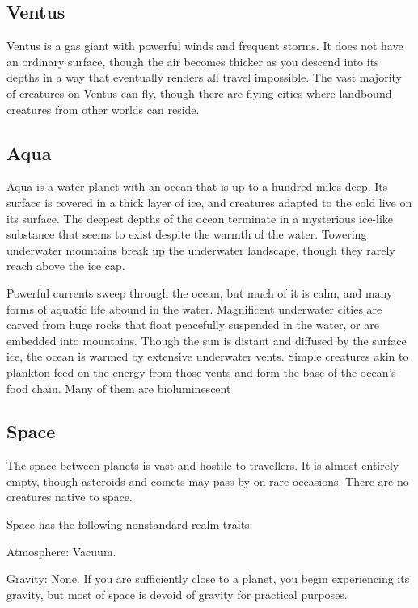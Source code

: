  \subsection{Ventus}
    Ventus is a gas giant with powerful winds and frequent storms.
    It does not have an ordinary surface, though the air becomes thicker as you descend into its depths in a way that eventually renders all travel impossible.
    The vast majority of creatures on Ventus can fly, though there are flying cities where landbound creatures from other worlds can reside.

  \subsection{Aqua}
    Aqua is a water planet with an ocean that is up to a hundred miles deep.
    Its surface is covered in a thick layer of ice, and creatures adapted to the cold live on its surface.
    The deepest depths of the ocean terminate in a mysterious ice-like substance that seems to exist despite the warmth of the water.
    Towering underwater mountains break up the underwater landscape, though they rarely reach above the ice cap.

    Powerful currents sweep through the ocean, but much of it is calm, and many forms of aquatic life abound in the water.
    Magnificent underwater cities are carved from huge rocks that float peacefully suspended in the water, or are embedded into mountains.
    Though the sun is distant and diffused by the surface ice, the ocean is warmed by extensive underwater vents.
    Simple creatures akin to plankton feed on the energy from those vents and form the base of the ocean's food chain.
    Many of them are bioluminescent

  \subsection{Space}
    The space between planets is vast and hostile to travellers.
    It is almost entirely empty, though asteroids and comets may pass by on rare occasions.
    There are no creatures native to space.

    Space has the following nonstandard realm traits:
    \begin{raggeditemize}
      \item Atmosphere: Vacuum.
      \item Gravity: None. If you are sufficiently close to a planet, you begin experiencing its gravity, but most of space is devoid of gravity for practical purposes.
    \end{raggeditemize}

